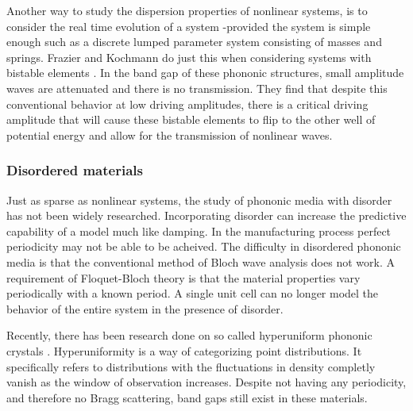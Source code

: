 \documentclass{article}
\begin{document}
Another way to study the dispersion properties of nonlinear systems, is to 
consider the real time evolution of a system -provided the system is 
simple enough such as a discrete lumped parameter system consisting of masses 
and springs. Frazier and Kochmann do just this when considering systems with 
bistable elements \cite{frazier16}. In the band gap of these phononic 
structures, small 
amplitude waves are attenuated and there is no transmission. They find that 
despite this conventional behavior at low driving amplitudes, there is a 
critical driving amplitude that will cause these bistable elements to flip to 
the other well of potential energy and allow for the transmission of nonlinear 
waves.


\subsubsection{Disordered materials}
Just as sparse as nonlinear systems, the study of phononic media with disorder 
has not been widely researched. Incorporating disorder can increase the 
predictive capability of a model much like damping. In the manufacturing 
process perfect periodicity may not be able to be acheived. The difficulty in 
disordered phononic media is that the conventional method of Bloch wave 
analysis does not work. A requirement of Floquet-Bloch theory is that the 
material properties vary periodically with a known period. A single unit cell 
can no longer model the behavior of the entire system in the presence of 
disorder.

Recently, there has been research done on so called hyperuniform phononic 
crystals \cite{florescu17}. Hyperuniformity is a way of categorizing point 
distributions. It 
specifically refers to distributions with the fluctuations in density completly 
vanish as the window of observation increases. Despite not having any 
periodicity, and therefore no Bragg scattering, band gaps still exist in 
these materials.
\end{document}

